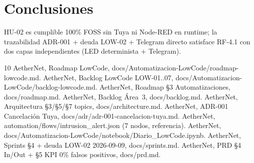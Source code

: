 \documentclass[conference]{IEEEtran}
\begin{document}
\section{Conclusiones}
HU-02 es cumplible 100\% FOSS sin Tuya ni Node-RED en runtime; la trazabilidad ADR-001 + deuda LOW-02 + Telegram directo satisface RF-4.1 con dos capas independientes (LED determinista + Telegram).

\begin{thebibliography}{10}
 AetherNet, Roadmap LowCode, docs/Automatizacion-LowCode/roadmap-lowcode.md.
 AetherNet, Backlog LowCode LOW-01..07, docs/Automatizacion-LowCode/backlog-lowcode.md.
 AetherNet, Roadmap \S3 Automatizaciones, docs/roadmap.md.
 AetherNet, Backlog Área~3, docs/backlog.md.
 AetherNet, Arquitectura \S3/\S5/\S7 topics, docs/architecture.md.
 AetherNet, ADR-001 Cancelación Tuya, docs/adr/adr-001-cancelacion-tuya.md.
 AetherNet, automation/flows/intrusion\_alert.json (7 nodos, referencia).
 AetherNet, docs/Automatizacion-LowCode/notebook/Diario\_LowCode.ipynb.
 AetherNet, Sprints \S4 + deuda LOW-02 2026-09-09, docs/sprints.md.
 AetherNet, PRD \S4 In/Out + \S5 KPI 0\% falsos positivos, docs/prd.md.
\end{thebibliography}
\end{document}
